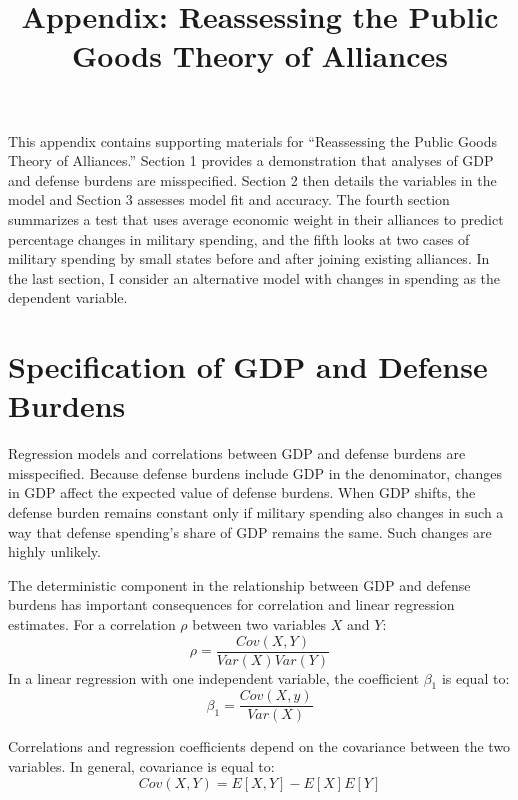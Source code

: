 \documentclass[12pt]{article}
\title{
\textbf{Appendix: Reassessing the Public Goods Theory of Alliances}
	}
\begin{document}
\maketitle 

\doublespace

This appendix contains supporting materials for ``Reassessing the Public Goods Theory of Alliances.'' 
Section 1 provides a demonstration that analyses of GDP and defense burdens are misspecified. 
Section 2 then details the variables in the model and Section 3 assesses model fit and accuracy. 
The fourth section summarizes a test that uses average economic weight in their alliances to predict percentage changes in military spending, and the fifth looks at two cases of military spending by small states before and after joining existing alliances.
In the last section, I consider an alternative model with changes in spending as the dependent variable. 


\section{Specification of GDP and Defense Burdens} 

Regression models and correlations between GDP and defense burdens are misspecified. 
Because defense burdens include GDP in the denominator, changes in GDP affect the expected value of defense burdens. 
When GDP shifts, the defense burden remains constant only if military spending also changes in such a way that defense spending's share of GDP remains the same.
Such changes are highly unlikely.


The deterministic component in the relationship between GDP and defense burdens has important consequences for correlation and linear regression estimates. 
For a correlation $\rho$ between two variables $X$ and $Y$:
\begin{equation}
\rho = \frac{Cov(X,Y)}{Var(X)Var(Y)} 
\end{equation}
In a linear regression with one independent variable, the coefficient $\beta_1$ is equal to:
\begin{equation}
\beta_1 = \frac{Cov(X,y)}{Var(X)} 
\end{equation} 

Correlations and regression coefficients depend on the covariance between the two variables. 
In general, covariance is equal to:
\begin{equation}
Cov(X, Y) = E[X,Y] - E[X] E[Y]
\end{equation}
\end{document}
